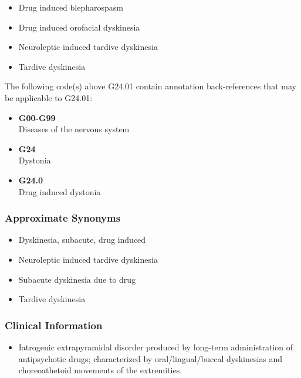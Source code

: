 \begin{paracol}{2}
\begin{leftcolumn}
\begin{itemize}
\tightlist
\item
  Drug induced blepharospasm
\item
  Drug induced orofacial dyskinesia
\item
  Neuroleptic induced tardive dyskinesia
\item
  Tardive dyskinesia
\end{itemize}

\noindent The following code(s) above G24.01 contain annotation back-references that may be applicable to G24.01:

\begin{itemize}
\tightlist
\item
  \textbf{G00-G99}\\
  Diseases of the nervous system
\item
  \textbf{G24}\\
  Dystonia
\item
  \textbf{G24.0}\\
  Drug induced dystonia
\end{itemize}

\hypertarget{approximate-synonyms-2}{%
\subsubsection{Approximate Synonyms}\label{approximate-synonyms-2}}

\begin{itemize}
\tightlist
\item
  Dyskinesia, subacute, drug induced
\item
  Neuroleptic induced tardive dyskinesia
\item
  Subacute dyskinesia due to drug
\item
  Tardive dyskinesia
\end{itemize}

\hypertarget{clinical-information-1}{%
\subsubsection{Clinical Information}\label{clinical-information-1}}

\begin{itemize}
\tightlist
\item
  Iatrogenic extrapyramidal disorder produced by long-term administration of antipsychotic drugs; characterized by oral/lingual/buccal dyskinesias and choreoathetoid movements of the extremities.
\end{itemize}


\end{leftcolumn}
\end{paracol}
